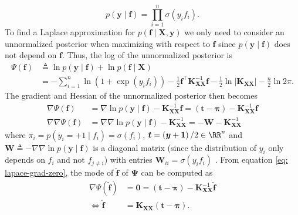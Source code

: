 \begin{equation*}
    p \left( \bm{y} \mid \bm{f} \right) = \prod_{i=1}^{n} \sigma \left( y_i f_i \right).
\end{equation*}
To find a Laplace approximation for $p \left( \bm{f} \mid \bm{X} , \bm{y} \right)$ we only need to consider an unnormalized posterior when maximizing with respect to $\bm{f}$ since $p \left( \bm{y} \mid \bm{f} \right)$ does not depend on $\bm{f}$. Thus, the log of the unnormalized posterior is
\begin{align*}
    \Psi \left( \bm{f} \right)
     & \triangleq \ln p \left( \bm{y} \mid \bm{f} \right) + \ln p \left( \bm{f} \mid \bm{X} \right)                                                                                                                                \\
     & = - \sum_{i=1}^{n} \ln \left( 1 + \exp \left( y_i f_i \right) \right) - \frac{1}{2} \bm{f}^{\intercal} \bm{K}_{\bm{X} \bm{X}}^{-1} \bm{f} - \frac{1}{2} \ln \left| \bm{K}_{\bm{X} \bm{X}} \right| - \frac{n}{2} \ln 2 \pi .
\end{align*}
The gradient and Hessian of the unnormalized posterior then becomes
\begin{align*}
    \nabla \Psi \left( \bm{f} \right)        & = \nabla \ln p \left( \bm{y} \mid \bm{f} \right) - \bm{K}_{\bm{X} \bm{X}}^{-1} \bm{f} = \left( \bm{t} - \bm{\pi} \right) - \bm{K}_{\bm{X} \bm{X}}^{-1} \bm{f} \\
    \nabla \nabla \Psi \left( \bm{f} \right) & = \nabla \nabla \ln p \left( \bm{y} \mid \bm{f} \right) - \bm{K}_{\bm{X} \bm{X}}^{-1} = - \bm{W} - \bm{K}_{\bm{X} \bm{X}}^{-1}
\end{align*}
where $\pi_i = p \left( y_i = +1 \mid f_i \right) = \sigma ( f_i )$, $\bm{t} = \left( \bm{y} + \bm{1} \right) / 2 \in \RR^{n}$ and $\bm{W} \triangleq - \nabla \nabla \ln p \left( \bm{y} \mid \bm{f} \right)$ is a diagonal matrix (since the distribution of $y_i$ only depends on $f_i$ and not $f_{j \neq i}$) with entries $\bm{W}_{ii} = \sigma \left( y_i f_i \right)$ \cite{BishopChristopherM2006Pram, RasmussenCarlEdward2006Gpfm}. From equation \ref{eq: lapace-grad-zero}, the mode of $\hat{\bm{f}}$ of $\bm{\Psi}$ can be computed as
\begin{align}
    \nabla \Psi \left( \hat{\bm{f}} \right) & = \bm{0} = \left( \bm{t} - \bm{\pi} \right) - \bm{K}_{\bm{X} \bm{X}}^{-1} \hat{\bm{f}} \nonumber \\
    \iff \hat{\bm{f}}                       & = \bm{K}_{\bm{X} \bm{X}} \left( \bm{t} - \bm{\pi} \right) \label{eq: expr-for-mode-lapace} .
\end{align}
